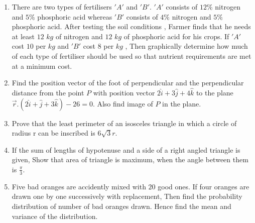 \documentclass{article}
\begin{document}
\begin{enumerate}
 \item There are two types of fertilisers $'A'$ and $'B'$. $'A'$ consists of $12\%$ nitrogen and $5\%$ phosphoric acid whereas $'B'$ consists of $4\%$ nitrogen and $5\%$ phosphoric acid. After testing the  soil conditions , Farmer finds that he needs at least $12$ $kg$ of nitrogen and $12$ $kg$ of phosphoric acid for his crops. If $'A'$ cost \rupee $10$ per $kg$ and $'B'$ cost \rupee $8$ per $kg$ , Then graphically determine how much of each type of fertiliser should be used so that nutrient requirements are met at a minimum cost.  
\item Find the position vector of the foot of perpendicular and the perpendicular distance from the point $P$ with position vector $ 2\hat{i}+3\hat{j}+4\hat{k} $ to the plane $\overrightarrow{r}.(2\hat{i}+\hat{j}+3\hat{k})-26 =0$. Also find image of $P$ in the plane.
 \item Prove that the least perimeter of an isosceles triangle in which a circle of radius r can be inscribed is $6\sqrt{3}r$.
 \item If the sum of lengths of hypotenuse and a side of a right angled triangle is given, Show that area of triangle is maximum, when the angle between them is $\frac{\pi}{3}$.
 \item Five bad oranges are accidently mixed with $20$ good ones. If four oranges are drawn one by one successively with replacement, Then find the probability distribution of number of bad oranges drawn. Hence find the mean and variance of the distribution.
\end{enumerate}
\end{document}
